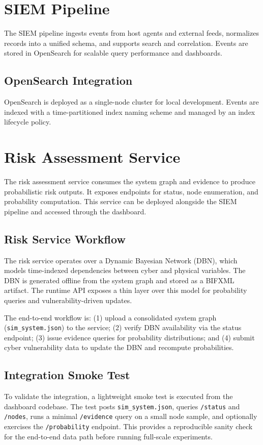 \documentclass[journal]{IEEEtran}
\begin{document}
\section{SIEM Pipeline}
The SIEM pipeline ingests events from host agents and external feeds, normalizes records
into a unified schema, and supports search and correlation. Events are stored in OpenSearch
for scalable query performance and dashboards.

\subsection{OpenSearch Integration}
OpenSearch is deployed as a single-node cluster for local development. Events are indexed
with a time-partitioned index naming scheme and managed by an index lifecycle policy.

\section{Risk Assessment Service}
The risk assessment service consumes the system graph and evidence to produce
probabilistic risk outputs. It exposes endpoints for status, node enumeration, and
probability computation. This service can be deployed alongside the SIEM pipeline and
accessed through the dashboard.

\subsection{Risk Service Workflow}
The risk service operates over a Dynamic Bayesian Network (DBN), which models time-indexed
dependencies between cyber and physical variables. The DBN is generated offline from the
system graph and stored as a BIFXML artifact. The runtime API exposes a thin layer over
this model for probability queries and vulnerability-driven updates.

The end-to-end workflow is: (1) upload a consolidated system graph
(\texttt{sim\_system.json}) to the service; (2) verify DBN availability via the status
endpoint; (3) issue evidence queries for probability distributions; and (4) submit cyber
vulnerability data to update the DBN and recompute probabilities.

\subsection{Integration Smoke Test}
To validate the integration, a lightweight smoke test is executed from the dashboard
codebase. The test posts \texttt{sim\_system.json}, queries \texttt{/status} and
\texttt{/nodes}, runs a minimal \texttt{/evidence} query on a small node sample, and
optionally exercises the \texttt{/probability} endpoint. This provides a reproducible
sanity check for the end-to-end data path before running full-scale experiments.
\end{document}
